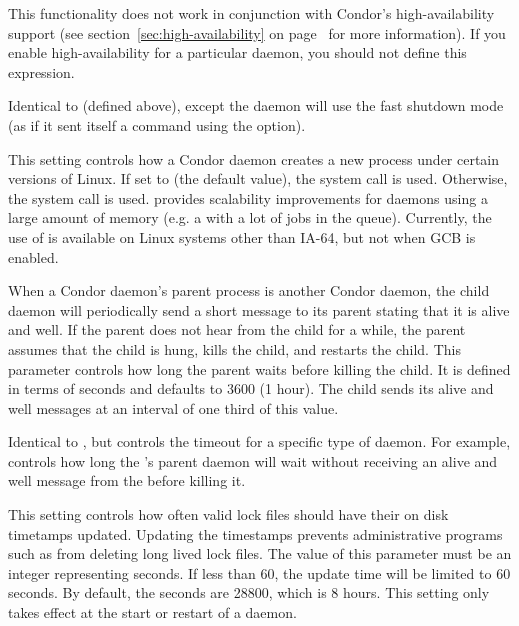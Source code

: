 \begin{description}
  \Note This functionality does not work in conjunction with Condor's
  high-availability support (see section~\ref{sec:high-availability}
  on page~\pageref{sec:high-availability} for more information).
  If you enable high-availability for a particular daemon, you should
  not define this expression.

\item[\Macro{DAEMON\_SHUTDOWN\_FAST}] \label{param:DaemonShutdownFast}
  Identical to  (defined above), except the
  daemon will use the fast shutdown mode (as if it sent itself a
   command using the  option).

\item[\Macro{USE\_CLONE\_TO\_CREATE\_PROCESSES}] \label{param:UseCloneToCreateProcesses}
  This setting controls how a Condor daemon creates a new process under
  certain versions of Linux. If set to  (the default value),
  the  system call is used. Otherwise, the  system
  call is used.  provides scalability improvements for daemons
  using a large amount of memory (e.g. a  with a lot of
  jobs in the queue). Currently, the use of  is available on
  Linux systems other than IA-64, but not when GCB is enabled.

\item[\Macro{NOT\_RESPONDING\_TIMEOUT}] \label{param:NotRespondingTimeout}
  When a Condor daemon's parent process is another Condor daemon, 
  the child daemon will
  periodically send a short message to its parent stating that it is alive
  and well. If the parent does not hear from the child for a while,
  the parent assumes that the child is hung,
  kills the child, and restarts the child. This parameter
  controls how long the parent waits before killing the child. It is defined
  in terms of seconds and defaults to 3600 (1 hour). The child sends its
  alive and well messages at an interval of one third of this value.

\item[\MacroB{<SUBSYS>\_NOT\_RESPONDING\_TIMEOUT}]
  \label{param:SubsysNotRespondingTimeout}
  Identical to , but controls the timeout
  for a specific type of daemon. For example,
   controls how long the
  's parent daemon will wait without receiving an 
  alive and well
  message from the  before killing it.

\item[\Macro{LOCK\_FILE\_UPDATE\_INTERVAL}] \label{param:LockFileUpdateInterval}
	This setting controls how often valid lock files should have their on disk
	timetamps updated. Updating the timestamps prevents administrative programs
	such as  from deleting long lived lock files. The
	value of this parameter must be an integer representing seconds. If less
	than 60, the update time will be limited to 60 seconds. By default,
	the seconds are 28800, which is 8 hours. This setting only takes effect
	at the start or restart of a daemon.

\end{description}

